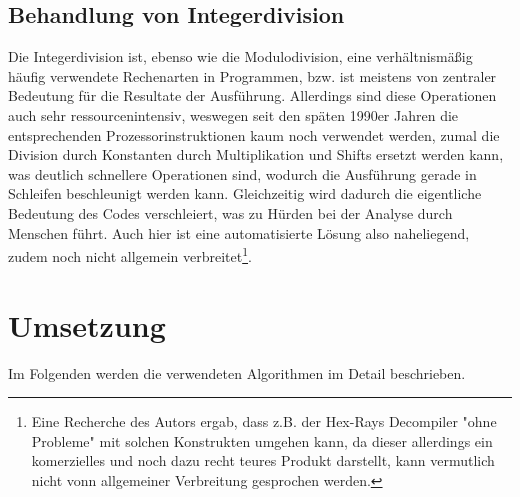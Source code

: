\documentclass[11pt]{article} %
\begin{document}
\begin{multicols}{2}
\subsection{Behandlung von Integerdivision}
Die Integerdivision ist, ebenso wie die Modulodivision, eine verhältnismäßig häufig verwendete Rechenarten in Programmen, bzw. ist meistens von zentraler Bedeutung für die Resultate der Ausführung. Allerdings sind diese Operationen auch sehr ressourcenintensiv, weswegen seit den späten 1990er Jahren die entsprechenden Prozessorinstruktionen kaum noch verwendet werden, zumal die Division durch Konstanten durch Multiplikation und Shifts ersetzt werden kann, was deutlich schnellere Operationen sind\cite{division:2}, wodurch die Ausführung gerade in Schleifen beschleunigt werden kann. Gleichzeitig wird dadurch die eigentliche Bedeutung des Codes verschleiert, was zu Hürden bei der Analyse durch Menschen führt. Auch hier ist eine automatisierte Lösung also naheliegend, zudem noch nicht allgemein verbreitet\footnote{Eine Recherche des Autors ergab, dass z.B. der Hex-Rays Decompiler "ohne Probleme" mit solchen Konstrukten umgehen kann, da dieser allerdings ein komerzielles und noch dazu recht teures Produkt darstellt, kann vermutlich nicht vonn allgemeiner Verbreitung gesprochen werden.}.

\section{Umsetzung}
Im Folgenden werden die verwendeten Algorithmen im Detail beschrieben.


\end{multicols}
\end{document}
